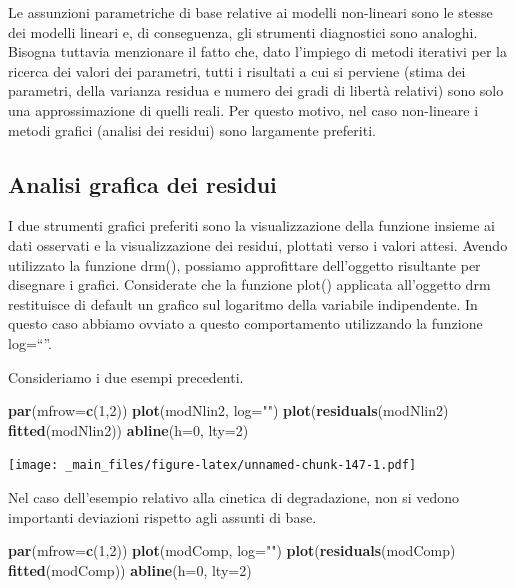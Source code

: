 \documentclass[a4paper,12pt,oneside]{book}
\newenvironment{Shaded}{\begin{snugshade}}{\end{snugshade}}
\newcommand{\KeywordTok}[1]{\textcolor[rgb]{0.13,0.29,0.53}{\textbf{#1}}}
\newcommand{\DataTypeTok}[1]{\textcolor[rgb]{0.13,0.29,0.53}{#1}}
\newcommand{\DecValTok}[1]{\textcolor[rgb]{0.00,0.00,0.81}{#1}}
\newcommand{\StringTok}[1]{\textcolor[rgb]{0.31,0.60,0.02}{#1}}
\newcommand{\OperatorTok}[1]{\textcolor[rgb]{0.81,0.36,0.00}{\textbf{#1}}}
\newcommand{\NormalTok}[1]{#1}
\theoremstyle{definition}
\theoremstyle{definition}
\theoremstyle{definition}
\theoremstyle{remark}
\begin{document}
Le assunzioni parametriche di base relative ai modelli non-lineari sono
le stesse dei modelli lineari e, di conseguenza, gli strumenti
diagnostici sono analoghi. Bisogna tuttavia menzionare il fatto che,
dato l'impiego di metodi iterativi per la ricerca dei valori dei
parametri, tutti i risultati a cui si perviene (stima dei parametri,
della varianza residua e numero dei gradi di libertà relativi) sono solo
una approssimazione di quelli reali. Per questo motivo, nel caso
non-lineare i metodi grafici (analisi dei residui) sono largamente
preferiti.

\subsection{Analisi grafica dei
residui}\label{analisi-grafica-dei-residui-1}

I due strumenti grafici preferiti sono la visualizzazione della funzione
insieme ai dati osservati e la visualizzazione dei residui, plottati
verso i valori attesi. Avendo utilizzato la funzione drm(), possiamo
approfittare dell'oggetto risultante per disegnare i grafici.
Considerate che la funzione plot() applicata all'oggetto drm restituisce
di default un grafico sul logaritmo della variabile indipendente. In
questo caso abbiamo ovviato a questo comportamento utilizzando la
funzione log=``''.

Consideriamo i due esempi precedenti.

\begin{Shaded}
\begin{Highlighting}[]
\KeywordTok{par}\NormalTok{(}\DataTypeTok{mfrow=}\KeywordTok{c}\NormalTok{(}\DecValTok{1}\NormalTok{,}\DecValTok{2}\NormalTok{))}
\KeywordTok{plot}\NormalTok{(modNlin2, }\DataTypeTok{log=}\StringTok{""}\NormalTok{)}
\KeywordTok{plot}\NormalTok{(}\KeywordTok{residuals}\NormalTok{(modNlin2) }\OperatorTok{~}\StringTok{ }\KeywordTok{fitted}\NormalTok{(modNlin2))}
\KeywordTok{abline}\NormalTok{(}\DataTypeTok{h=}\DecValTok{0}\NormalTok{, }\DataTypeTok{lty=}\DecValTok{2}\NormalTok{)}
\end{Highlighting}
\end{Shaded}

\texttt{[image: \_main\_files/figure-latex/unnamed-chunk-147-1.pdf]}

Nel caso dell'esempio relativo alla cinetica di degradazione, non si
vedono importanti deviazioni rispetto agli assunti di base.

\begin{Shaded}
\begin{Highlighting}[]
\KeywordTok{par}\NormalTok{(}\DataTypeTok{mfrow=}\KeywordTok{c}\NormalTok{(}\DecValTok{1}\NormalTok{,}\DecValTok{2}\NormalTok{))}
\KeywordTok{plot}\NormalTok{(modComp, }\DataTypeTok{log=}\StringTok{""}\NormalTok{)}
\KeywordTok{plot}\NormalTok{(}\KeywordTok{residuals}\NormalTok{(modComp) }\OperatorTok{~}\StringTok{ }\KeywordTok{fitted}\NormalTok{(modComp))}
\KeywordTok{abline}\NormalTok{(}\DataTypeTok{h=}\DecValTok{0}\NormalTok{, }\DataTypeTok{lty=}\DecValTok{2}\NormalTok{)}
\end{Highlighting}
\end{Shaded}
\end{document}
